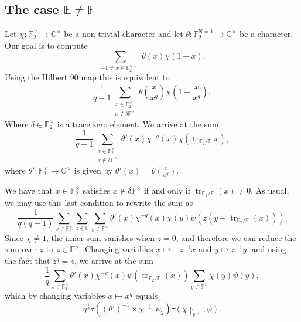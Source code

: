 \documentclass[12pt, reqno]{amsart}
\theoremstyle{definition}
\theoremstyle{definition}
\theoremstyle{definition}
\newcommand{\cComplex}{\mathbb{C}}
\newcommand{\multiplicativegroup}[1]{#1^{\times}}
\newcommand{\fieldCharacter}{\psi}
\newcommand{\trace}{\operatorname{tr}}
\newcommand{\aFieldNorm}{\mathrm{N}}
\newcommand{\finiteField}{\mathbb{F}}
\newcommand{\quadraticExtension}{\mathbb{E}}
\newcommand{\finiteFieldExtension}[1]{\finiteField_{#1}}
\newcommand{\NormOneGroup}[1]{\finiteFieldExtension{#1}^{\aFieldNorm = 1}}
\newcommand{\GaussSumCharacter}[3]{\tau\left(#1 \times #2, #3\right)}
\begin{document}
\subsection{The case $\quadraticExtension \ne \finiteField$}
Let $\chi \colon \multiplicativegroup{\finiteFieldExtension{2}} \to \multiplicativegroup{\cComplex}$ be a non-trivial character and let $\theta \colon \NormOneGroup{2} \to \multiplicativegroup{\cComplex}$ be a character. Our goal is to compute $$\sum_{-1 \ne x \in \NormOneGroup{2}} \theta\left(x\right) \chi\left(1+x\right).$$
Using the Hilbert 90 map this is equivalent to
$$\frac{1}{q-1} \sum_{\substack{x \in \multiplicativegroup{\finiteFieldExtension{2}}\\
x \notin \delta \multiplicativegroup{\finiteField}}} \theta\left(\frac{x}{x^q}\right) \chi\left(1+\frac{x}{x^q}\right),$$
Where $\delta \in \multiplicativegroup{\finiteFieldExtension{2}}$ is a trace zero element. 
We arrive at the sum
$$\frac{1}{q-1} \sum_{\substack{x \in \multiplicativegroup{\finiteFieldExtension{2}}\\
		x \notin \delta \multiplicativegroup{\finiteField}}} \theta'\left(x\right) \chi^{-q}\left(x\right) \chi\left(\trace_{\finiteFieldExtension{2} \slash \finiteField} x\right),$$
	where $\theta' \colon \multiplicativegroup{\finiteFieldExtension{2}} \to \multiplicativegroup{\cComplex}$ is given by $\theta'\left(x\right) = \theta\left(\frac{x}{x^q}\right)$.
	
	We have that $x \in \multiplicativegroup{\finiteFieldExtension{2}}$ satisfies $x \notin \delta \multiplicativegroup{\finiteField}$ if and only if $\trace_{\finiteFieldExtension{2} \slash \finiteField}\left(x\right) \ne 0$. As usual, we may use this last condition to rewrite the sum as
	$$\frac{1}{q\left(q-1\right)} \sum_{x \in \multiplicativegroup{\finiteFieldExtension{2}}}\sum_{z \in \finiteField} \sum_{y \in \multiplicativegroup{\finiteField}}  \theta'\left(x\right) \chi^{-q}\left(x\right) \chi\left(y\right) \fieldCharacter\left(z\left(y - \trace_{\finiteFieldExtension{2} \slash \finiteField} \left(x\right)\right)\right).$$
	Since $\chi \ne 1$, the inner sum vanishes when $z = 0$, and therefore we can reduce the sum over $z$ to $z \in \multiplicativegroup{\finiteField}$. Changing variables $x \mapsto -z^{-1} x$ and $y \mapsto z^{-1} y$, and using the fact that $z^q = z$, we arrive at the sum
	$$\frac{1}{q} \sum_{x \in \multiplicativegroup{\finiteFieldExtension{2}}}\theta'\left(x\right)  \chi^{-q}\left(x\right) \fieldCharacter\left(\trace_{\finiteFieldExtension{2} \slash \finiteField} \left(x\right)\right) \sum_{y \in \multiplicativegroup{\finiteField}}   \chi\left(y\right) \fieldCharacter\left(y\right),$$
	which by changing variables $x \mapsto x^q$ equals
	$$q^{\frac{1}{2}} \GaussSumCharacter{\left(\theta'\right)^{-1}}{\chi^{-1}}{\fieldCharacter_{2}} \tau\left(\chi \restriction_{\multiplicativegroup{\finiteField}}, \fieldCharacter\right).$$



\end{document}

